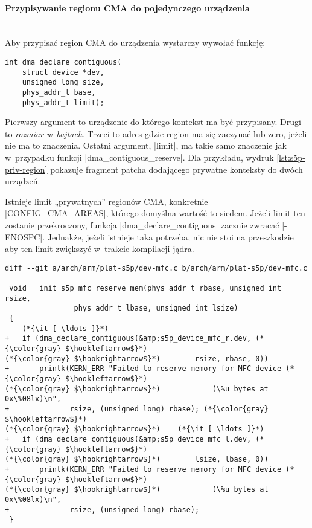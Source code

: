\paragraph{Przypisywanie regionu CMA do pojedynczego urządzenia} \hspace{0pt} \\

Aby przypisać region CMA do urządzenia wystarczy wywołać funkcję:

\begin{lstlisting}
int dma_declare_contiguous(
	struct device *dev,
	unsigned long size,
	phys_addr_t base,
	phys_addr_t limit);
\end{lstlisting}

Pierwszy argument to urządzenie do którego kontekst ma być przypisany.
Drugi to \emph{rozmiar w~bajtach}.  Trzeci to adres gdzie region ma
się zaczynać lub zero, jeżeli nie ma to znaczenia.  Ostatni argument,
\code|limit|, ma takie samo znaczenie jak w~przypadku funkcji
\code|dma_contiguous_reserve|.  Dla przykładu, wydruk
\ref{lst:s5p-priv-region} pokazuje fragment patcha dodającego prywatne
konteksty do dwóch urządzeń.

Istnieje limit „prywatnych” regionów CMA, konkretnie
\code|CONFIG_CMA_AREAS|, którego domyślna wartość to siedem.
Jeżeli limit ten zostanie przekroczony, funkcja
\code|dma_declare_contiguous| zacznie zwracać
\code|-ENOSPC|.  Jednakże, jeżeli istnieje taka potrzeba, nic nie
stoi na przeszkodzie aby ten limit zwiększyć w~trakcie kompilacji
jądra.

\begin{lstlisting}[float=tbhp,caption={Przypisanie prywatnych regionów
      CMA do dwóch urządzeń.},label=lst:s5p-priv-region]
diff --git a/arch/arm/plat-s5p/dev-mfc.c b/arch/arm/plat-s5p/dev-mfc.c

 void __init s5p_mfc_reserve_mem(phys_addr_t rbase, unsigned int rsize,
 				phys_addr_t lbase, unsigned int lsize)
 {
	(*{\it [ \ldots ]}*)
+	if (dma_declare_contiguous(&amp;s5p_device_mfc_r.dev, (*{\color{gray} $\hookleftarrow$}*)
(*{\color{gray} $\hookrightarrow$}*)		rsize, rbase, 0))
+		printk(KERN_ERR "Failed to reserve memory for MFC device (*{\color{gray} $\hookleftarrow$}*)
(*{\color{gray} $\hookrightarrow$}*)			(\%u bytes at 0x\%08lx)\n",
+		       rsize, (unsigned long) rbase); (*{\color{gray} $\hookleftarrow$}*)
(*{\color{gray} $\hookrightarrow$}*)	(*{\it [ \ldots ]}*)
+	if (dma_declare_contiguous(&amp;s5p_device_mfc_l.dev, (*{\color{gray} $\hookleftarrow$}*)
(*{\color{gray} $\hookrightarrow$}*)		lsize, lbase, 0))
+		printk(KERN_ERR "Failed to reserve memory for MFC device (*{\color{gray} $\hookleftarrow$}*)
(*{\color{gray} $\hookrightarrow$}*)			(\%u bytes at 0x\%08lx)\n",
+		       rsize, (unsigned long) rbase);
 }
\end{lstlisting}

